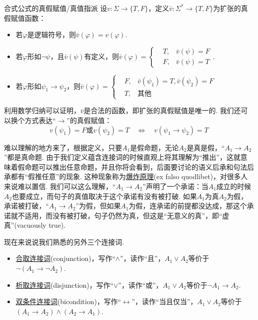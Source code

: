 \begin{definition}{合式公式的真假赋值/真值指派}
    设\(v: \Sigma \to \{T,F\}\)，定义\(\bar v:\Sigma^* \to \{T,F\}\)为扩张的真假赋值函数：
    \begin{itemize}
        \item 若\(\varphi\)是逻辑符号，则\(\bar v(\varphi) = v(\varphi)\).
        \item 若\(\varphi\)形如\(\neg \psi\)，且\(\bar v(\psi)\)有定义，则\(\bar v(\varphi) = \left\{\begin{aligned} &T, & \bar v(\psi) = F \\ & F, & \bar v(\psi) = T \end{aligned}\right.\).
        \item 若\(\varphi\)形如\(\psi_1 \to \psi_2\)，则\(\bar v(\varphi) = \left\{\begin{aligned} &F, & \bar v(\psi_1) = T, \bar v(\psi_2) = F \\ & T, & \mbox{其他} \end{aligned}\right.\)
    \end{itemize}
\end{definition}

利用数学归纳可以证明，\(\bar v\)是合法的函数，即扩张的真假赋值是唯一的. 我们还可以换个方式表达“\(\to\)”的真假赋值：
\[v(\psi_1)=F\mbox{或}v(\psi_2)=T \quad \Longleftrightarrow \quad v(\psi_1 \to \psi_2)=T\]

\begin{note}
    难以理解的地方来了，根据定义，只要\(A_1\)是假命题，无论\(A_2\)是真是假，“\(A_1 \to A_2\)”都是真命题. 由于我们定义蕴含连接词的时候直观上将其理解为“推出”，这就意味着假命题可以推出任意命题，并且你将会看到，后面要讨论的语义后承和句法后承都有“假推任意”的现象. 这种现象称为\underline{爆炸原理}(ex falso quodlibet)，对很多人来说难以置信. 我们可以这么理解，“\(A_1 \to A_2\)”声明了一个承诺：当\(A_1\)成立的时候\(A_2\)也要成立，而句子的真值取决于这个承诺有没有被打破. 如果\(A_1\)为真\(A_2\)为假，承诺被打破，“\(A_1 \to A_2\)”为假，但如果\(A_1\)为假，连承诺的前提都没达成，那这个承诺就不适用，而没有被打破，句子仍然为真，但这是“无意义的真”，即“虚真”(vacuously true).
\end{note}

现在来说说我们熟悉的另外三个连接词.
\begin{itemize}
    \item \underline{合取连接词}(conjunction)，写作“\(\wedge\)”，读作“且”，\(A_1 \vee A_2\)等价于\(\neg (A_1 \to \neg A_2)\).
    \item \underline{析取连接词}(disjunction)，写作“\(\vee\)”，读作“或”，\(A_1 \vee A_2\)等价于\(\neg A_1 \to A_2\).
    \item \underline{双条件连接词}(bicondition)，写作“\(\leftrightarrow\)”，读作“当且仅当”，\(A_1 \vee A_2\)等价于\((A_1 \to A_2) \wedge (A_2 \to A_1)\).
\end{itemize}

